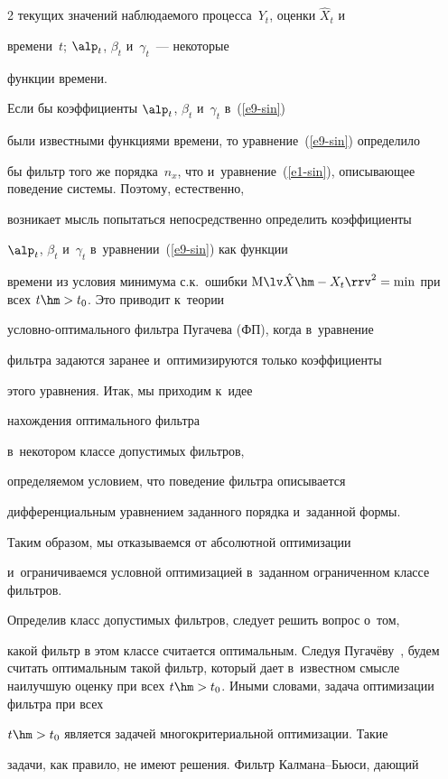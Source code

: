 \begin{multicols}{2}
текущих значений наблюдаемого процесса~$Y_t$, оценки $\hat{X}_t$ и

времени~$t$; $\alp_t$, $\beta_t$ и~$\gamma_t$~--- некоторые

функции времени.



Если бы коэффициенты  $\alp_t$, $\beta_t$ и~$\gamma_t$ в~(\ref{e9-sin})

были известными функциями времени, то уравнение~(\ref{e9-sin}) определило

бы фильтр того же  порядка~${n_x}$, что и~уравнение~(\ref{e1-sin}), описывающее поведение системы. Поэтому, естественно,

возникает мысль попытаться непосредственно определить коэффициенты

$\alp_t$, $\beta_t$ и~$\gamma_t$ в~уравнении~(\ref{e9-sin}) как функции

времени из условия минимума с.к.\ ошибки  $\mathrm{M}\lv

\hat{X} \hm- X_t\rrv^2 =\min$ при всех  $t\hm>t_0$. Это приводит к~теории

услов\-но-оп\-ти\-маль\-но\-го фильт\-ра Пугачева (ФП), когда в~уравнение

фильт\-ра задаются заранее и~оптимизируются только коэффициенты

этого уравнения. Итак, мы приходим к~идее

нахождения оптимального фильт\-ра

в~некотором классе допустимых фильт\-ров,

определяемом условием, что поведение фильт\-ра описывается

дифференциальным уравнением заданного порядка и~заданной формы.

Таким образом, мы отказываемся от абсолютной оптимизации

и~ограничиваемся условной оптимизацией в~заданном ограниченном классе фильтров.



Определив класс допустимых фильтров, следует решить вопрос о~том,

какой фильтр в этом классе считается оптимальным. Следуя Пугачёву~\cite{1-sin}, будем считать оптимальным такой фильтр, который дает в~известном смысле наилучшую оценку при всех $t\hm>t_0$. Иными словами, задача оптимизации фильтра при всех

$t\hm>t_0$ является  задачей многокритериальной оптимизации. Такие

задачи, как правило, не имеют решения. Фильтр Кал\-ма\-на--Бью\-си, дающий


\end{multicols}
